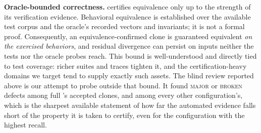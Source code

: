 \textbf{Oracle-bounded correctness.}
\sys certifies equivalence only up to the strength of its verification evidence. Behavioral equivalence is established over the available test corpus and the oracle's recorded vectors and invariants; it is not a formal proof. Consequently, an equivalence-confirmed clone is guaranteed equivalent \emph{on the exercised behaviors}, and residual divergence can persist on inputs neither the tests nor the oracle probes reach. This bound is well-understood and directly tied to test coverage: richer suites and traces tighten it, and the certification-heavy domains we target tend to supply exactly such assets. The blind review reported above is our attempt to probe outside that bound. It found \textsc{major} or \textsc{broken} defects among full \sys's accepted clones, and among every other configuration's, which is the sharpest available statement of how far the automated evidence falls short of the property it is taken to certify, even for the configuration with the highest recall.

